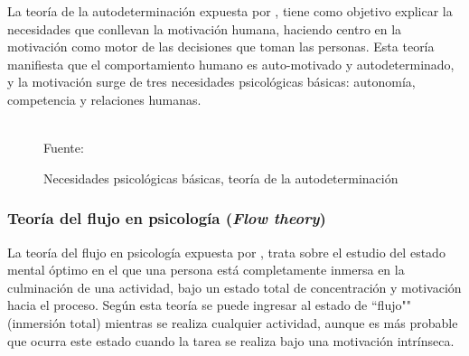 La teoría de la autodeterminación expuesta por , tiene como objetivo explicar la 
necesidades que conllevan la motivación humana, haciendo centro en la motivación como motor de las decisiones 
que toman las personas. Esta teoría manifiesta que el comportamiento humano es auto-motivado y
autodeterminado, y la motivación surge de tres necesidades psicológicas básicas: autonomía, competencia y 
relaciones humanas.

\begin{figure}[ht]
\caption{Necesidades psicológicas básicas, teoría de la autodeterminación}
\label{img:SDT}
\centering
{}
\\
{\footnotesize Fuente: \citeA<basada en>{deci1985intrinsic}}
\end{figure}

\subsubsection{Teoría del flujo en psicología (\textit{Flow theory})}

La teoría del flujo en psicología expuesta por , trata sobre el estudio del estado 
mental óptimo en el que una persona está completamente inmersa en la culminación de una actividad, bajo un
estado total de concentración y motivación hacia el proceso. Según esta teoría se puede ingresar al estado de 
``flujo"" (inmersión total) mientras se realiza cualquier actividad, aunque es más probable que ocurra este
estado cuando la tarea se realiza bajo una motivación intrínseca.

